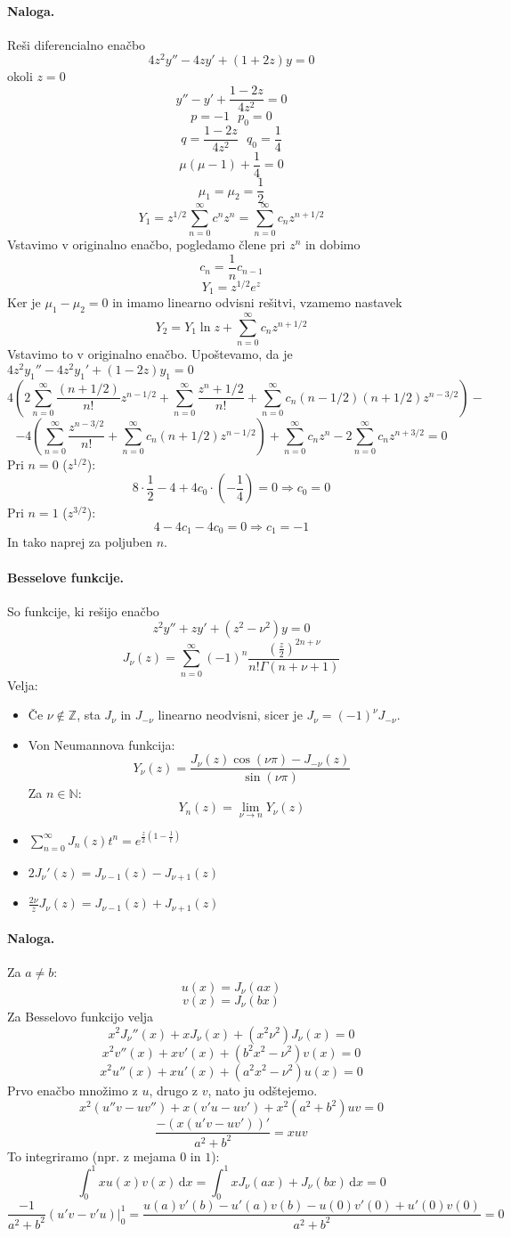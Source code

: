 \documentclass[a4paper]{article}
\newcommand{\dif}{\mathrm{d}}
\newcommand{\Z}{\mathbb{Z}}
\newcommand{\N}{\mathbb{N}}
\newcommand{\Sum}[2][0]{\sum_{{#2} = {#1}}^{\infty}}
\begin{document}
\paragraph{Naloga.} Reši diferencialno enačbo
$$4z^2 y'' - 4zy' + (1+2z) y = 0$$
okoli $z=0$
$$y'' - y' + \frac{1 - 2z}{4z^2} = 0$$
$$p = -1~~~p_0 = 0$$
$$q = \frac{1 - 2z}{4z^2}~~~q_0 = \frac{1}{4}$$
$$\mu(\mu - 1) + \frac{1}{4} = 0$$
$$\mu_1 = \mu_2 = \frac{1}{2}$$
$$Y_1 = z^{1/2}\Sum{n}c^nz^n = \Sum{n} c_nz^{n+1/2}$$
Vstavimo v originalno enačbo, pogledamo člene pri $z^n$ in dobimo
$$c_n = \frac{1}{n}c_{n-1}$$
$$Y_1 = z^{1/2}e^z$$
Ker je $\mu_1 - \mu_2 = 0$ in imamo linearno odvisni rešitvi, vzamemo nastavek
$$Y_2 = Y_1 \ln z + \Sum{n}c_nz^{n+1/2}$$
Vstavimo to v originalno enačbo. Upoštevamo, da je $4z^2y_1'' - 4z^2y_1' + (1-2z)y_1 = 0$
$$4\left(2\Sum{n}\frac{(n+1/2)}{n!}z^{n-1/2} + \Sum{n}\frac{z^n+1/2}{n!} + \Sum{n}c_n(n-1/2)(n+1/2)z^{n-3/2}\right) - $$
$$ -4\left(\Sum{n} \frac{z^{n-3/2}}{n!} + \Sum{n} c_n(n+1/2)z^{n-1/2}\right) + \Sum{n}c_nz^n - 2\Sum{n} c_nz^{n+3/2} = 0$$
Pri $n=0$ ($z^{1/2}$):
$$8 \cdot \frac{1}{2} - 4 + 4c_0\cdot \left(-\frac{1}{4}\right) = 0 \Rightarrow c_0 = 0$$
Pri $n = 1$ ($z^{3/2}$):
$$4 - 4c_1 - 4c_0 = 0 \Rightarrow c_1 = -1$$
In tako naprej za poljuben $n$.
\paragraph{Besselove funkcije.} So funkcije, ki rešijo enačbo $$z^2 y'' + zy' + (z^2 - \nu^2)y = 0$$
$$J_\nu(z) = \Sum{n} (-1)^n\frac{\left(\frac{z}{2}\right)^{2n + \nu}}{n!\Gamma(n+\nu+1)}$$
Velja:
\begin{itemize}
    \item Če $\nu \notin \Z$, sta $J_\nu$ in $J_{-\nu}$ linearno neodvisni, sicer je $J_{\nu} = (-1)^\nu J_{-\nu}$.
    \item Von Neumannova funkcija: $$Y_\nu(z) = \frac{J_\nu(z)\cos(\nu \pi) - J_{-\nu}(z)}{\sin(\nu \pi)}$$ Za $n \in \N$: $$Y_n(z) = \lim_{\nu \to n} Y_\nu(z)$$
    \item $\Sum{n} J_n(z)t^n = e^{\frac{z}{2}\left(1 - \frac{1}{t}\right)}$
    \item $2J_\nu'(z) = J_{\nu - 1}(z) - J_{\nu + 1}(z)$
    \item $\displaystyle{\frac{2\nu}{z}J_\nu(z) = J_{\nu - 1}(z) + J_{\nu + 1}(z)}$
\end{itemize}
\paragraph{Naloga.} Za $a \neq b$:
$$u(x) = J_\nu(ax)$$
$$v(x) = J_\nu(bx)$$
Za Besselovo funkcijo velja $$x^2 J_\nu''(x) + xJ_\nu(x) + (x^2  \nu^2) J_\nu(x) = 0$$
$$x^2 v''(x) + xv'(x) + (b^2x^2 - \nu^2) v(x) = 0$$
$$x^2 u''(x) + xu'(x) + (a^2x^2 - \nu^2) u(x) = 0$$
Prvo enačbo množimo z $u$, drugo z $v$, nato ju odštejemo.
$$x^2(u''v - uv'') + x(v'u - uv') + x^2(a^2 + b^2) uv = 0$$
$$\frac{-\left(x(u'v - uv')\right)'}{a^2 + b^2} = xuv$$
To integriramo (npr. z mejama $0$ in $1$):
$$\int_{0}^{1} x u(x) v(x) \, \dif x = \int_{0}^{1} x J_\nu(ax) + J_\nu(bx) \, \dif x= 0$$
$$\frac{-1}{a^2 + b^2} (u'v - v'u)\Big|_{0}^1 = \frac{u(a)v'(b) - u'(a)v(b) - u(0)v'(0) + u'(0)v(0)}{a^2 + b^2} = 0$$
\end{document}
